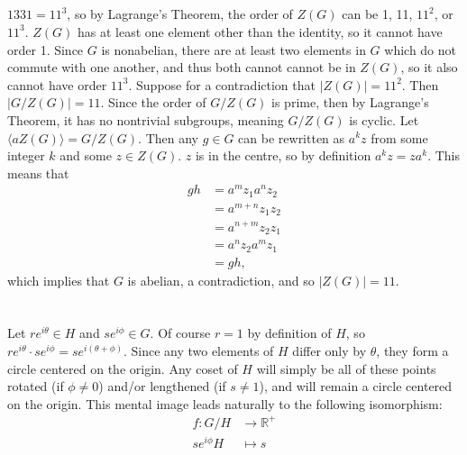 \documentclass[11pt]{article}
\begin{document}
\subsection{} %
$1331=11^3$, so by Lagrange's Theorem, the order of $Z(G)$ can be 1, 11, $11^2$,
or $11^3$. $Z(G)$ has at least one element other than the identity, so it cannot
have order 1. Since $G$ is nonabelian, there are at least two elements in $G$
which do not commute with one another, and thus both cannot cannot be in $Z(G)$, so it
also cannot have order $11^3$.
\newline
\newline
Suppose for a contradiction that $|Z(G)|=11^2$. Then $|G/Z(G)|=11$. Since the
order of $G/Z(G)$ is prime, then by Lagrange's Theorem, it has no nontrivial
subgroups, meaning $G/Z(G)$ is cyclic. Let $\langle aZ(G)\rangle=G/Z(G)$. Then
any $g\in G$ can be rewritten as $a^kz$ from some integer $k$ and some
$z\in Z(G)$. $z$ is in the centre, so by definition $a^kz=za^k$. This means
that
\begin{align*}
	gh&=a^mz_1a^nz_2\\
	&=a^{m+n}z_1z_2\\
	&=a^{n+m}z_2z_1\\
	&=a^nz_2a^mz_1\\
	&=gh,
\end{align*}
which implies that $G$ is abelian, a contradiction, and so $|Z(G)|=11$.


\section{} %
Let $re^{i\theta}\in H$ and $se^{i\phi}\in G$. Of course $r=1$ by definition of
$H$, so $re^{i\theta}\cdot se^{i\phi}=se^{i(\theta+\phi)}$. Since any two
elements of $H$ differ only by $\theta$, they form a circle centered on the origin.
Any coset of $H$ will simply be all of these points rotated (if $\phi\neq0$) and/or
lengthened (if $s\neq1$), and will remain a circle centered on the origin.  This
mental image leads naturally to the following isomorphism:
\begin{align*}
	f: G/H&\longrightarrow\mathbb{R}^+\\
	se^{i\phi}H&\longmapsto s
\end{align*}


\section{} %
\end{document}
